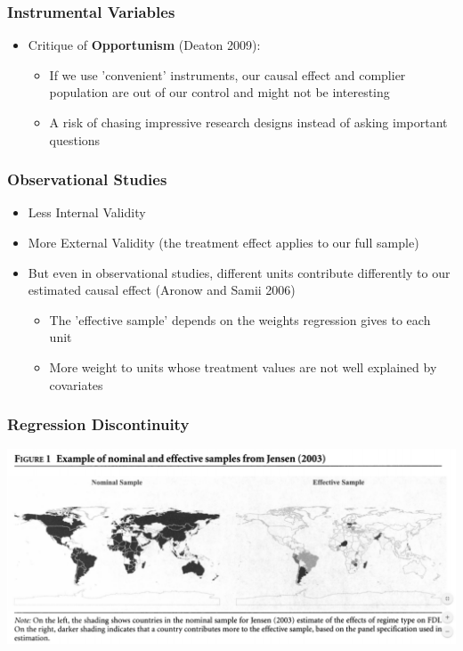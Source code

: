 \documentclass[xcolor=x11names,compress]{beamer}\usepackage[]{graphicx}\usepackage[]{color}
\renewcommand{\(}{\begin{columns}}
\renewcommand{\)}{\end{columns}}
\newcommand{\<}[1]{\begin{column}{#1}}
\renewcommand{\>}{\end{column}}
\begin{document}
\begin{frame}
\frametitle{Instrumental Variables}
\begin{itemize}
\item Critique of \textbf{Opportunism} (Deaton 2009):
\pause
\begin{itemize}
\item If we use 'convenient' instruments, our causal effect and complier population are out of our control and might not be interesting
\pause
\item A risk of chasing impressive research designs instead of asking important questions
\end{itemize}
\end{itemize}
\end{frame}

\begin{frame}
\frametitle{Observational Studies}
\begin{itemize}
\item Less Internal Validity
\pause
\item More External Validity (the treatment effect applies to our full sample)
\pause
\item But even in observational studies, different units contribute differently to our estimated causal effect (Aronow and Samii 2006)
\pause
\begin{itemize}
\item The 'effective sample' depends on the weights regression gives to each unit
\pause
\item More weight to units whose treatment values are not well explained by covariates
\end{itemize}
\end{itemize}
\end{frame}

\begin{frame}
\frametitle{Regression Discontinuity}
\includegraphics[width=\textwidth]{Effective_Sample.png}
\end{frame}
\end{document}
